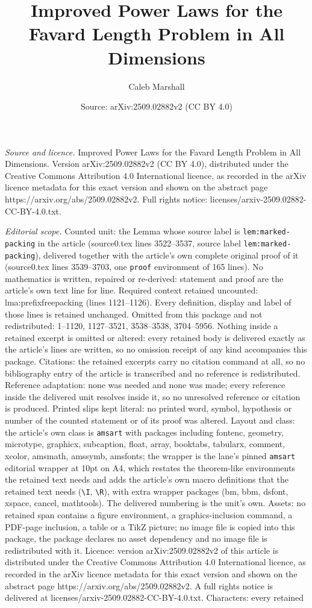 \documentclass[10pt,a4paper]{amsart}
\title[Improved Power Laws for the Favard Length Problem in All Dim]{Improved Power Laws for the Favard Length Problem in All Dimensions}
\author{Caleb Marshall}
\date{Source: arXiv:2509.02882v2 (CC BY 4.0)}
\begin{document}
\maketitle

\noindent\emph{Source and licence.} Improved Power Laws for the Favard Length Problem in All Dimensions. Version arXiv:2509.02882v2 (CC BY 4.0), distributed under the Creative Commons Attribution 4.0 International licence, as recorded in the arXiv licence metadata for this exact version and shown on the abstract page https://arxiv.org/abs/2509.02882v2. Full rights notice: licenses/arxiv-2509.02882-CC-BY-4.0.txt.\par\smallskip

\noindent\textit{Editorial scope.} Counted unit: the Lemma whose source label is \texttt{lem:marked-packing} in the article (source0.tex lines 3522--3537, source label \texttt{lem:marked-packing}), delivered together with the article's own complete original proof of it (source0.tex lines 3539--3703, one \texttt{proof} environment of 165 lines). No mathematics is written, repaired or re-derived: statement and proof are the article's own text line for line. Required context retained uncounted: lma:prefixfreepacking (lines 1121--1126). Every definition, display and label of those lines is retained unchanged. Omitted from this package and not redistributed: 1--1120, 1127--3521, 3538--3538, 3704--5956. Nothing inside a retained excerpt is omitted or altered: every retained body is delivered exactly as the article's lines are written, so no omission receipt of any kind accompanies this package. Citations: the retained excerpts carry no citation command at all, so no bibliography entry of the article is transcribed and no reference is redistributed. Reference adaptation: none was needed and none was made; every reference inside the delivered unit resolves inside it, so no unresolved reference or citation is produced. Printed slips kept literal: no printed word, symbol, hypothesis or number of the counted statement or of its proof was altered. Layout and class: the article's own class is \texttt{amsart} with packages including fontenc, geometry, microtype, graphicx, subcaption, float, array, booktabs, tabularx, comment, xcolor, amsmath, amssymb, amsfonts; the wrapper is the lane's pinned \texttt{amsart} editorial wrapper at 10pt on A4, which restates the theorem-like environments the retained text needs and adds the article's own macro definitions that the retained text needs (\texttt{\textbackslash I}, \texttt{\textbackslash R}), with extra wrapper packages (bm, bbm, dsfont, xspace, cancel, mathtools). The delivered numbering is the unit's own. Assets: no retained span contains a figure environment, a graphics-inclusion command, a PDF-page inclusion, a table or a TikZ picture; no image file is copied into this package, the package declares no asset dependency and no image file is redistributed with it. Licence: version arXiv:2509.02882v2 of this article is distributed under the Creative Commons Attribution 4.0 International licence, as recorded in the arXiv licence metadata for this exact version and shown on the abstract page https://arxiv.org/abs/2509.02882v2. A full rights notice is delivered at licenses/arxiv-2509.02882-CC-BY-4.0.txt. Characters: every retained 
\end{document}
